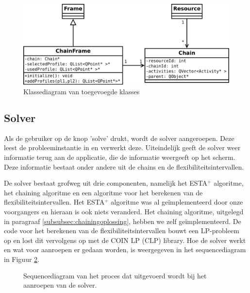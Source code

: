 \begin{figure}[H]
\centering
\includegraphics[width=.95\textwidth]{../images/klasse-diagram.png}
\caption{Klassediagram van toegevoegde klasses}
\label{fig:klassediagram}
\end{figure}

\subsection{Solver}
Als de gebruiker op de knop 'solve' drukt, wordt de solver aangeroepen. Deze leest de probleeminstantie in en verwerkt deze. Uiteindelijk geeft de solver weer informatie terug aan de applicatie, die de informatie weergeeft op het scherm. Deze informatie bestaat onder andere uit de chains en de flexibiliteitsintervallen.

De solver bestaat grofweg uit drie componenten, namelijk het ESTA$^+$ algoritme, het chaining algoritme en een algoritme voor het berekenen van de flexibiliteitsintervallen. Het ESTA$^+$ algoritme was al ge\"implementeerd door onze voorgangers en hieraan is ook niets veranderd. Het chaining algoritme, uitgelegd in paragraaf \ref{subsubsec:chainingoplossing}, hebben we zelf ge\"implementeerd. De code voor het berekenen van de flexibiliteitsintervallen bouwt een LP-probleem op en lost dit vervolgens op met de COIN LP (CLP) library. Hoe de solver werkt en wat voor aanroepen er gedaan worden, is weergegeven in het sequencediagram in Figuur \ref{fig:sd}.

\newpage
\begin{figure}[H]
\centering

\caption{Sequencediagram van het proces dat uitgevoerd wordt bij het aanroepen van de solver.} 
\label{fig:sd}
\end{figure}

\newpage
